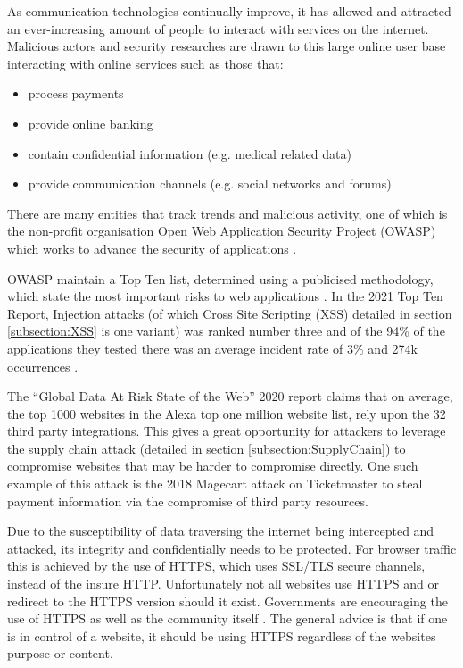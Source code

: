 \documentclass{mscreport}
\begin{document}
As communication technologies continually improve, it has allowed and attracted an ever-increasing amount of people to interact with services on the internet. Malicious actors and security researches are drawn to this large online user base interacting with online services such as those that:
\begin{itemize}
	\setlength\itemsep{0.1em}
	\item process payments \cite{Herman2019-zb}
	\item provide online banking \cite{Gezer2019-oy}
	\item contain confidential information (e.g. medical related data) \cite{Mrdjenovich2020-vz}
	\item provide communication channels (e.g. social networks and forums)
\end{itemize}

\vspace{0.3cm} \noindent
There are many entities that track trends and malicious activity, one of which is the non-profit organisation Open Web Application Security Project (OWASP) which works to advance the security of applications \cite{noauthor_undated-ta,Kellezi2021-nd}.

\vspace{0.3cm} \noindent
OWASP maintain a Top Ten list, determined using a publicised methodology, which state the most important risks to web applications \cite{Kellezi2021-nd,noauthor_undated-kz}. In the 2021 Top Ten Report, Injection attacks (of which Cross Site Scripting (XSS) detailed in section \ref{subsection:XSS} is one variant) was ranked number three and of the 94\% of the applications they tested there was an average incident rate of 3\% and 274k occurrences \cite{noauthor_undated-gt}.

\vspace{0.3cm} \noindent
The ``Global Data At Risk State of the Web'' 2020 report \cite{Tala_Security2020-ee} claims that on average, the top 1000 websites in the Alexa top one million website list, rely upon the 32 third party integrations. This gives a great opportunity for attackers to leverage the supply chain attack (detailed in section \ref{subsection:SupplyChain}) to compromise websites that may be harder to compromise directly. One such example of this attack is the 2018 Magecart attack on Ticketmaster \cite{Herman2019-zb} to steal payment information via the compromise of third party resources.

\vspace{0.3cm} \noindent
Due to the susceptibility of data traversing the internet being intercepted and attacked, its integrity and confidentially needs to be protected. For browser traffic this is achieved by the use of HTTPS, which uses SSL/TLS secure channels, instead of the insure HTTP. Unfortunately not all websites use HTTPS and or redirect to the HTTPS version should it exist. Governments are encouraging the use of HTTPS \cite{noauthor_undated-oz} as well as the community itself \cite{noauthor_undated-xk}. The general advice is that if one is in control of a website, it should be using HTTPS regardless of the websites purpose or content. 
\end{document}
